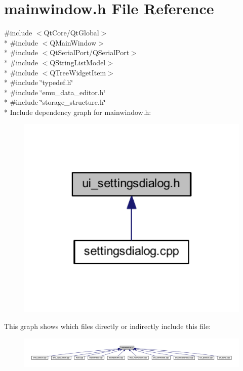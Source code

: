 \hypertarget{a00110}{\section{mainwindow.\+h File Reference}
\label{a00110}
}
{\ttfamily \#include $<$Qt\+Core/\+Qt\+Global$>$}\\*
{\ttfamily \#include $<$Q\+Main\+Window$>$}\\*
{\ttfamily \#include $<$Qt\+Serial\+Port/\+Q\+Serial\+Port$>$}\\*
{\ttfamily \#include $<$Q\+String\+List\+Model$>$}\\*
{\ttfamily \#include $<$Q\+Tree\+Widget\+Item$>$}\\*
{\ttfamily \#include \char`\"{}typedef.\+h\char`\"{}}\\*
{\ttfamily \#include \char`\"{}emu\+\_\+data\+\_\+editor.\+h\char`\"{}}\\*
{\ttfamily \#include \char`\"{}storage\+\_\+structure.\+h\char`\"{}}\\*
Include dependency graph for mainwindow.\+h\+:
\nopagebreak
\begin{figure}[H]
\begin{center}
\leavevmode
\includegraphics[width=350pt]{d0/dcd/a00280}
\end{center}
\end{figure}
This graph shows which files directly or indirectly include this file\+:
\nopagebreak
\begin{figure}[H]
\begin{center}
\leavevmode
\includegraphics[width=350pt]{d2/d04/a00281}
\end{center}
\end{figure}
